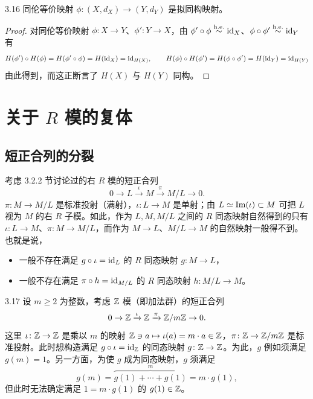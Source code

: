 \begin{corollary}{3.16} 同伦等价映射 $\phi\colon(X,d_X)\to(Y,d_Y)$ 是拟同构映射。
\end{corollary}

\begin{proof}
对同伦等价映射 $\phi\colon X\to Y$、$\phi'\colon Y\to X$，由 $\phi'\circ\phi\overset{\mathrm{h.e.}}{\sim}\mathrm{id}_X$、$\phi\circ\phi'\overset{\mathrm{h.e.}}{\sim}\mathrm{id}_Y$ 有
\[
H(\phi')\circ H(\phi)=H(\phi'\circ\phi)=H(\mathrm{id}_X)=\mathrm{id}_{H(X)},\qquad
H(\phi)\circ H(\phi')=H(\phi\circ\phi')=H(\mathrm{id}_Y)=\mathrm{id}_{H(Y)}
\]
由此得到，而这正断言了 $H(X)$ 与 $H(Y)$ 同构。
\end{proof}


\section{关于 $R$ 模的复体}

\subsection{短正合列的分裂}

考虑 3.2.2 节讨论过的右 $R$ 模的短正合列
\[
0\to L\xrightarrow{\iota}M\xrightarrow{\pi}M/L\to 0.
\]
$\pi\colon M\to M/L$ 是标准投射（满射），$\iota\colon L\to M$ 是单射；由 $L\simeq\operatorname{Im}(\iota)\subset M$ 可把 $L$ 视为 $M$ 的右 $R$ 子模。如此，作为 $L,M,M/L$ 之间的 $R$ 同态映射自然得到的只有 $\iota\colon L\to M$、$\pi\colon M\to M/L$，而作为 $M\to L$、$M/L\to M$ 的自然映射一般得不到。也就是说，
\begin{itemize}
\item 一般不存在满足 $g\circ\iota=\mathrm{id}_L$ 的 $R$ 同态映射 $g\colon M\to L$，
\item 一般不存在满足 $\pi\circ h=\mathrm{id}_{M/L}$ 的 $R$ 同态映射 $h\colon M/L\to M$。
\end{itemize}

\begin{example}{3.17}
设 $m\ge 2$ 为整数，考虑 $\mathbb{Z}$ 模（即加法群）的短正合列
\[
0\to \mathbb{Z}\xrightarrow{\iota}\mathbb{Z}\xrightarrow{\pi}\mathbb{Z}/m\mathbb{Z}\to 0.
\]
这里 $\iota\colon\mathbb{Z}\to\mathbb{Z}$ 是乘以 $m$ 的映射 $\mathbb{Z}\ni a\mapsto\iota(a)=m\cdot a\in\mathbb{Z}$，$\pi\colon\mathbb{Z}\to\mathbb{Z}/m\mathbb{Z}$ 是标准投射。此时想构造满足 $g\circ\iota=\mathrm{id}_{\mathbb{Z}}$ 的同态映射 $g\colon\mathbb{Z}\to\mathbb{Z}$。为此，$g$ 例如须满足 $g(m)=1$。另一方面，为使 $g$ 成为同态映射，$g$ 须满足
\[
g(m)=\overbrace{g(1)+\cdots+g(1)}^{m}=m\cdot g(1),
\]
但此时无法确定满足 $1=m\cdot g(1)$ 的 $g(1)\in\mathbb{Z}$。
\end{example}

